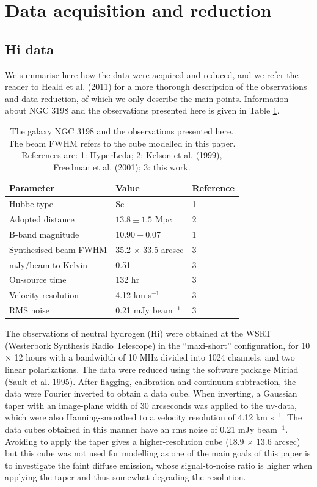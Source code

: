 \documentclass[traditabstract]{aa}
\begin{document}
\section{Data acquisition and reduction}

\subsection{H{\sc i} data}

We summarise here how the data were acquired and reduced, and we refer
the reader to Heald et al. (2011) for a more thorough description of
the observations and data reduction, of which we only
describe the main points. Information about NGC 3198 and the
observations presented here is given in Table \ref{tab-obs}.

\begin{table}
\caption{The galaxy NGC 3198 and the observations presented here. The
  beam FWHM refers to the cube modelled in this paper. References are: 1:
  HyperLeda; 2: Kelson et al. (1999), Freedman
et al. (2001); 3: this work.}              

\label{tab-obs}      
\centering                                      
\begin{tabular}{l l l}  
\hline\hline     
Parameter                & Value & Reference \\    
\hline
Hubbe type & Sc & 1  \\
Adopted distance & $13.8\pm 1.5 $ Mpc  & 2 \\
B-band magnitude & $10.90 \pm 0.07$  & 1 \\
\hline                       
Synthesised beam FWHM & 35.2 $\times$ 33.5 arcsec& 3\\
mJy/beam to Kelvin & 0.51 &  3 \\ 
On-source time & 132 hr & 3\\
Velocity resolution & 4.12 km s$^{-1}$&  3\\
RMS noise & 0.21 mJy beam$^{-1}$ &3\\
\hline       
\end{tabular}
\end{table}

The observations of neutral hydrogen (H{\sc i}) were obtained at the WSRT
(Westerbork Synthesis Radio Telescope) in the ``maxi-short''
configuration, for 10 $\times$ 12 hours with a bandwidth of 10 MHz divided
into 1024 channels, and two linear polarizations. The data were
reduced using the software package Miriad (Sault et al. 1995). After
flagging, calibration and continuum subtraction, the data were Fourier
inverted to obtain a data cube. When inverting, a Gaussian taper with
an image-plane width of 30 arcseconds was applied to the uv-data,
which were also Hanning-smoothed to a velocity resolution of 4.12 km
s$^{-1}$. The data cubes obtained in this manner have an rms noise of 0.21
mJy beam$^{-1}$. Avoiding to apply the taper gives a higher-resolution cube
(18.9 $\times$ 13.6 arcsec) but this cube was not used for modelling as one
of the main goals of this paper is to investigate the faint diffuse
emission, whose signal-to-noise ratio is higher when applying the
taper and thus somewhat degrading the resolution. 
\end{document}
